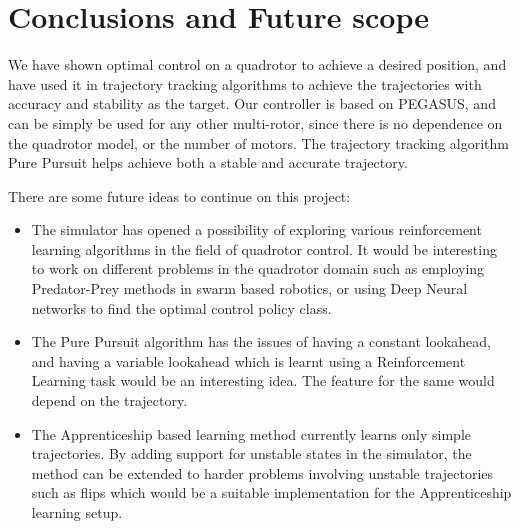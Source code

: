 \documentclass[hidelinks,BTech]{iitmdiss}
\begin{document}
\chapter{Conclusions and Future scope}
We have shown optimal control on a quadrotor to achieve a desired position, and have used it in trajectory tracking algorithms to achieve the trajectories with accuracy and stability as the target. Our controller is based on PEGASUS, and can be simply be used for any other multi-rotor, since there is no dependence on the quadrotor model, or the number of motors. The trajectory tracking algorithm Pure Pursuit helps achieve both a stable and accurate trajectory.

There are some future ideas to continue on this project:
\begin{itemize}
	\item The simulator has opened a possibility of exploring various reinforcement learning algorithms in the field of quadrotor control. It would be interesting to work on different problems in the quadrotor domain such as employing Predator-Prey methods in swarm based robotics, or using Deep Neural networks to find the optimal control policy class. 
	\item The Pure Pursuit algorithm has the issues of having a constant lookahead, and having a variable lookahead which is learnt using a Reinforcement Learning task would be an interesting idea. The feature for the same would depend on the trajectory.
	\item The Apprenticeship based learning method currently learns only simple trajectories. By adding support for unstable states in the simulator, the method can be extended to harder problems involving unstable trajectories such as flips which would be a suitable implementation for the Apprenticeship learning setup.
\end{itemize}


\begin{singlespace}
  \pagebreak
  \clearpage
  
\end{singlespace}
\end{document}
